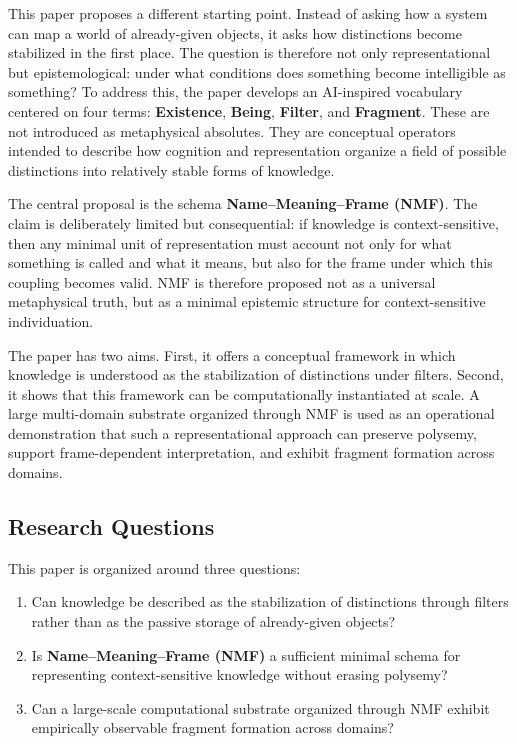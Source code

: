 \documentclass[11pt,a4paper]{article}
\newcommand{\nmf}{\textbf{Name--Meaning--Frame (NMF)}}
\newcommand{\term}[1]{\textbf{#1}}
\begin{document}
This paper proposes a different starting point. Instead of asking how a system can map a world of already-given objects, it asks how distinctions become stabilized in the first place. The question is therefore not only representational but epistemological: under what conditions does something become intelligible as something? To address this, the paper develops an AI-inspired vocabulary centered on four terms: \term{Existence}, \term{Being}, \term{Filter}, and \term{Fragment}. These are not introduced as metaphysical absolutes. They are conceptual operators intended to describe how cognition and representation organize a field of possible distinctions into relatively stable forms of knowledge.

The central proposal is the schema \nmf. The claim is deliberately limited but consequential: if knowledge is context-sensitive, then any minimal unit of representation must account not only for what something is called and what it means, but also for the frame under which this coupling becomes valid. NMF is therefore proposed not as a universal metaphysical truth, but as a minimal epistemic structure for context-sensitive individuation.

The paper has two aims. First, it offers a conceptual framework in which knowledge is understood as the stabilization of distinctions under filters. Second, it shows that this framework can be computationally instantiated at scale. A large multi-domain substrate organized through NMF is used as an operational demonstration that such a representational approach can preserve polysemy, support frame-dependent interpretation, and exhibit fragment formation across domains.

\subsection{Research Questions}

This paper is organized around three questions:
\begin{enumerate}[leftmargin=2em]
    \item Can knowledge be described as the stabilization of distinctions through filters rather than as the passive storage of already-given objects?
    \item Is \nmf{} a sufficient minimal schema for representing context-sensitive knowledge without erasing polysemy?
    \item Can a large-scale computational substrate organized through NMF exhibit empirically observable fragment formation across domains?
\end{enumerate}
\end{document}
